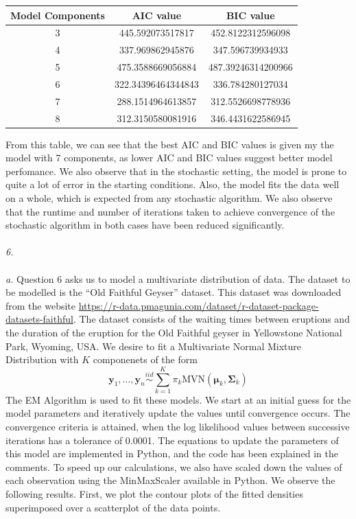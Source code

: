 \documentclass[11pt]{article}
\begin{document}
\begin{center}
\begin{tabular}{ |c|c|c| }
  \hline
 \textbf{Model Components} & \textbf{AIC value} & \textbf{BIC value}\\
 \hline
 3 & 445.592073517817 & 452.8122312596098 \\
 \hline
 4 & 337.969862945876 & 347.596739934933 \\
 \hline
 5 & 475.3588669056884 & 487.39246314200966 \\
 \hline
 6 & 322.34396464344843 & 336.784280127034 \\
 \hline
 7 & 288.1514964613857 & 312.5526698778936 \\
 \hline
 8 & 312.3150580081916 & 346.4431622586945 \\
 \hline
\end{tabular}
\end{center}
From this table, we can see that the best AIC and BIC values is given my the model with 7 components, as lower AIC and BIC values suggest better model perfomance. We also observe that in the stochastic setting, the model is prone to quite a lot of error in the starting conditions. Also, the model fits the data well on a whole, which is expected from any stochastic algorithm. We also observe that the runtime and number of iterations taken to achieve convergence of the stochastic algorithm in both cases have been reduced significantly. \\ \\
\noindent \emph{6.} \\ \\
\emph{a.} Question 6 asks us to model a multivariate distribution of data. The dataset to be modelled is the ``Old Faithful Geyser'' dataset. This dataset was downloaded from the website \url{https://r-data.pmagunia.com/dataset/r-dataset-package-datasets-faithful}. The dataset consists of the waiting times between eruptions and the duration of the eruption for the Old Faithful geyser in Yellowstone National Park, Wyoming, USA. We desire to fit a Multivariate Normal Mixture Distribution with $K$ componenets of the form
\begin{equation}
  \nonumber
  \mathbf{y}_{1}, \dots, \mathbf{y}_{n} \overset{iid}{\sim} \sum_{k = 1}^{K} \pi_{k}\text{MVN}(\bm{\mu}_{k}, \bm{\Sigma}_{k})
\end{equation}
The EM Algorithm is used to fit these models. We start at an initial guess for the model parameters and iteratively update the values until convergence occurs. The convergence criteria is attained, when the log likelihood values between successive iterations has a tolerance of 0.0001. The equations to update the parameters of this model are implemented in Python, and the code has been explained in the comments. To speed up our calculations, we also have scaled down the values of each observation using the MinMaxScaler available in Python. We observe the following results. First, we plot the contour plots of the fitted densities superimposed over a scatterplot of the data points.
\end{document}
